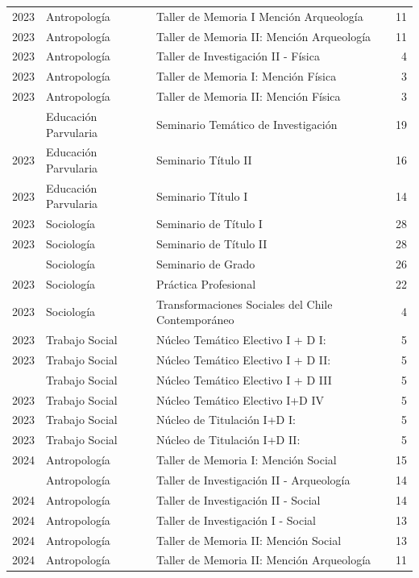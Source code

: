 \documentclass[
  spanish,
  a4paper,
  oneside]{scrbook}
\begin{document}
\begin{longtable}[t]{lllr}
2023 & Antropología & Taller de Memoria I Mención Arqueología & 11\\
2023 & Antropología & Taller de Memoria II: Mención Arqueología & 11\\
2023 & Antropología & Taller de Investigación II - Física & 4\\
2023 & Antropología & Taller de Memoria I: Mención Física & 3\\
2023 & Antropología & Taller de Memoria II: Mención Física & 3\\
\addlinespace
2023 & Educación Parvularia & Seminario Temático de Investigación & 19\\
2023 & Educación Parvularia & Seminario Título II & 16\\
2023 & Educación Parvularia & Seminario Título I & 14\\
2023 & Sociología & Seminario de Título I & 28\\
2023 & Sociología & Seminario de Título II & 28\\
\addlinespace
2023 & Sociología & Seminario de Grado & 26\\
2023 & Sociología & Práctica Profesional & 22\\
2023 & Sociología & Transformaciones Sociales del Chile Contemporáneo & 4\\
2023 & Trabajo Social & Núcleo Temático Electivo I + D I: & 5\\
2023 & Trabajo Social & Núcleo Temático Electivo I + D II: & 5\\
\addlinespace
2023 & Trabajo Social & Núcleo Temático Electivo I + D III & 5\\
2023 & Trabajo Social & Núcleo Temático Electivo I+D IV & 5\\
2023 & Trabajo Social & Núcleo de Titulación I+D I: & 5\\
2023 & Trabajo Social & Núcleo de Titulación I+D II: & 5\\
2024 & Antropología & Taller de Memoria I: Mención Social & 15\\
\addlinespace
2024 & Antropología & Taller de Investigación II - Arqueología & 14\\
2024 & Antropología & Taller de Investigación II - Social & 14\\
2024 & Antropología & Taller de Investigación I - Social & 13\\
2024 & Antropología & Taller de Memoria II: Mención Social & 13\\
2024 & Antropología & Taller de Memoria II: Mención Arqueología & 11\\

\end{longtable}
\end{document}
